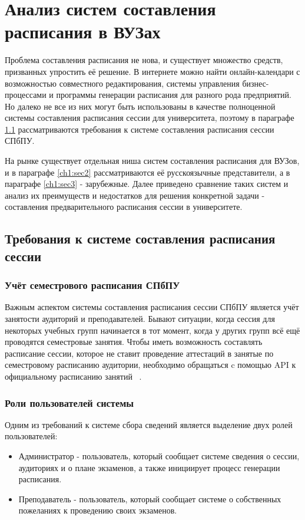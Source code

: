 \chapter{Анализ систем составления расписания в ВУЗах} \label{ch1}

Проблема составления расписания не нова, и существует множество средств, призванных упростить её решение. В интернете можно найти онлайн-календари с возможностью совместного редактирования, системы управления бизнес-процессами и программы генерации расписания для разного рода предприятий. Но далеко не все из них могут быть использованы в качестве полноценной системы составления расписания сессии для университета, поэтому в параграфе \ref{ch1:sec1} рассматриваются требования к системе составления расписания сессии СПбПУ.

На рынке существует отдельная ниша систем составления расписания для ВУЗов, и в параграфе \ref{ch1:sec2} рассматриваются её русскоязычные представители, а в параграфе \ref{ch1:sec3} - зарубежные. Далее приведено сравнение таких систем и анализ их преимуществ и недостатков для решения конкретной задачи - составления предварительного расписания сессии в университете.

\section{Требования к системе составления расписания сессии} \label{ch1:sec1}

\subsection{Учёт семестрового расписания СПбПУ}

Важным аспектом системы составления расписания сессии СПбПУ является учёт занятости аудиторий и преподавателей. Бывают ситуации, когда сессия для некоторых учебных групп начинается в тот момент, когда у других групп всё ещё проводятся семестровые занятия. Чтобы иметь возможность составлять расписание сессии, которое не ставит проведение аттестаций в занятые по семестровому расписанию аудитории, необходимо обращаться c помощью API к официальному расписанию занятий ~\cite{ruz}. 

\subsection{Роли пользователей системы}
Одним из требований к системе сбора сведений является выделение двух ролей пользователей:
\begin{itemize}
	\item Администратор - пользователь, который сообщает системе сведения о сессии, аудиториях и о плане экзаменов, а также инициирует процесс генерации расписания.
	\item Преподаватель - пользователь, который сообщает системе о собственных пожеланиях к проведению своих экзаменов.
\end{itemize}

